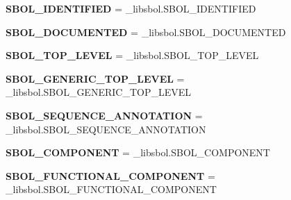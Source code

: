 \begin{DoxyCompactItemize}
\item 
{\bfseries S\+B\+O\+L\+\_\+\+I\+D\+E\+N\+T\+I\+F\+I\+ED} = \+\_\+libsbol.\+S\+B\+O\+L\+\_\+\+I\+D\+E\+N\+T\+I\+F\+I\+ED\hypertarget{namespacesbol_1_1libsbol_aa8facf4c6257ea1de43166568ed9813f}{}\label{namespacesbol_1_1libsbol_aa8facf4c6257ea1de43166568ed9813f}

\item 
{\bfseries S\+B\+O\+L\+\_\+\+D\+O\+C\+U\+M\+E\+N\+T\+ED} = \+\_\+libsbol.\+S\+B\+O\+L\+\_\+\+D\+O\+C\+U\+M\+E\+N\+T\+ED\hypertarget{namespacesbol_1_1libsbol_a4e4c4ce089e90cf2b146790291d29218}{}\label{namespacesbol_1_1libsbol_a4e4c4ce089e90cf2b146790291d29218}

\item 
{\bfseries S\+B\+O\+L\+\_\+\+T\+O\+P\+\_\+\+L\+E\+V\+EL} = \+\_\+libsbol.\+S\+B\+O\+L\+\_\+\+T\+O\+P\+\_\+\+L\+E\+V\+EL\hypertarget{namespacesbol_1_1libsbol_a042c596bf801280a0063e6239c708541}{}\label{namespacesbol_1_1libsbol_a042c596bf801280a0063e6239c708541}

\item 
{\bfseries S\+B\+O\+L\+\_\+\+G\+E\+N\+E\+R\+I\+C\+\_\+\+T\+O\+P\+\_\+\+L\+E\+V\+EL} = \+\_\+libsbol.\+S\+B\+O\+L\+\_\+\+G\+E\+N\+E\+R\+I\+C\+\_\+\+T\+O\+P\+\_\+\+L\+E\+V\+EL\hypertarget{namespacesbol_1_1libsbol_aa5231f4a7be69d517791399b0e2f5db7}{}\label{namespacesbol_1_1libsbol_aa5231f4a7be69d517791399b0e2f5db7}

\item 
{\bfseries S\+B\+O\+L\+\_\+\+S\+E\+Q\+U\+E\+N\+C\+E\+\_\+\+A\+N\+N\+O\+T\+A\+T\+I\+ON} = \+\_\+libsbol.\+S\+B\+O\+L\+\_\+\+S\+E\+Q\+U\+E\+N\+C\+E\+\_\+\+A\+N\+N\+O\+T\+A\+T\+I\+ON\hypertarget{namespacesbol_1_1libsbol_a3478bcb49db9545032bdc03ef3e9f8c3}{}\label{namespacesbol_1_1libsbol_a3478bcb49db9545032bdc03ef3e9f8c3}

\item 
{\bfseries S\+B\+O\+L\+\_\+\+C\+O\+M\+P\+O\+N\+E\+NT} = \+\_\+libsbol.\+S\+B\+O\+L\+\_\+\+C\+O\+M\+P\+O\+N\+E\+NT\hypertarget{namespacesbol_1_1libsbol_a449794e8b948f4aaa13a485cf34faa54}{}\label{namespacesbol_1_1libsbol_a449794e8b948f4aaa13a485cf34faa54}

\item 
{\bfseries S\+B\+O\+L\+\_\+\+F\+U\+N\+C\+T\+I\+O\+N\+A\+L\+\_\+\+C\+O\+M\+P\+O\+N\+E\+NT} = \+\_\+libsbol.\+S\+B\+O\+L\+\_\+\+F\+U\+N\+C\+T\+I\+O\+N\+A\+L\+\_\+\+C\+O\+M\+P\+O\+N\+E\+NT\hypertarget{namespacesbol_1_1libsbol_a1fc71eb07e128ac14b50b80d679abb09}{}\label{namespacesbol_1_1libsbol_a1fc71eb07e128ac14b50b80d679abb09}


\end{DoxyCompactItemize}
